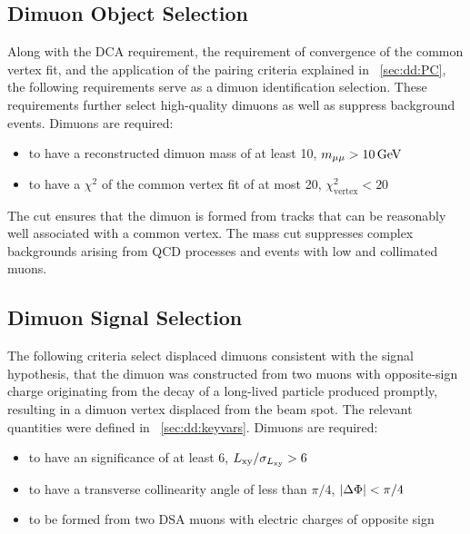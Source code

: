 \subsection{Dimuon Object Selection}
\label{sec:dd:DimuonObject}
Along with the DCA requirement, the requirement of convergence of the common vertex fit, and the application of the pairing criteria explained in \Sec~\ref{sec:dd:PC}, the following requirements serve as a dimuon identification selection.
These requirements further select high-quality dimuons as well as suppress background events.
Dimuons are required:
\begin{itemize}
  \item to have a reconstructed dimuon mass of at least 10\GeV, \ie $m_{\mathrm{\mu}\mathrm{\mu}} > 10\,\text{Ge\hspace{-.08em}V}$
  \item to have a $\chi^2$ of the common vertex fit of at most 20, \ie $\chi^2_\text{vertex} < 20$
\end{itemize}

The \vchisq cut ensures that the dimuon is formed from tracks that can be reasonably well associated with a common vertex.
The mass cut suppresses complex backgrounds arising from QCD processes and events with low \pT and collimated muons.

\subsection{Dimuon Signal Selection}
\label{sec:dd:DimuonSignal}
The following criteria select displaced dimuons consistent with the signal hypothesis, \ie that the dimuon was constructed from two muons with opposite-sign charge originating from the decay of a long-lived particle produced promptly, resulting in a dimuon vertex displaced from the beam spot.
The relevant quantities were defined in \Sec~\ref{sec:dd:keyvars}.
Dimuons are required:
\begin{itemize}
  \item to have an \Lxy significance of at least 6, \ie $L_{\mathrm{xy}}/\sigma_{L_{\mathrm{xy}}} > 6$
  \item to have a transverse collinearity angle of less than $\pi/4$, \ie $|\Delta\Phi| < \pi/4$
  \item to be formed from two DSA muons with electric charges of opposite sign
\end{itemize}

